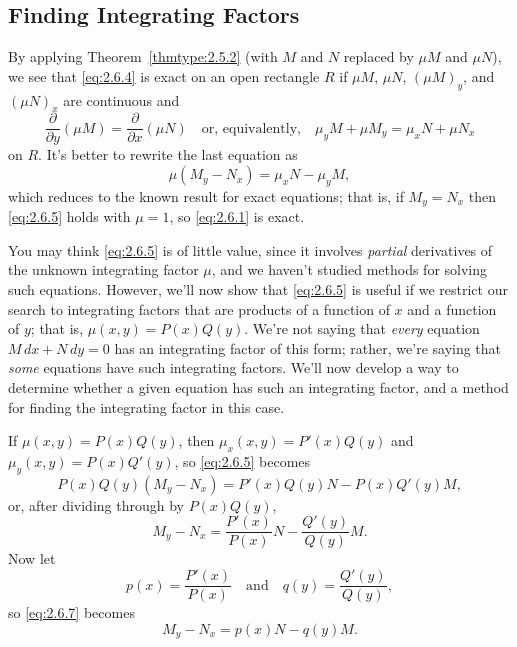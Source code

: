 \documentclass{ximera}
\begin{document}
\subsection*{Finding Integrating Factors}

By applying Theorem~\ref{thmtype:2.5.2} (with $M$ and $N$ replaced by $\mu M$
and $\mu N$), we see that \eqref{eq:2.6.4} is exact on an open rectangle
$R$ if $\mu M$, $\mu N$, $(\mu M)_y$, and $(\mu N)_x$ are continuous
and
$$
\frac{\partial}{\partial y}(\mu M)=\frac{\partial}{\partial x}
(\mu N) \quad\text{or, equivalently,}\quad
\mu_yM+\mu M_y=\mu_xN+\mu N_x
$$
on $R$. It's better to rewrite the last equation as
\begin{equation} \label{eq:2.6.5}
\mu(M_y-N_x)=\mu_xN-\mu_yM,
\end{equation}
which  reduces to  the known result for exact equations;
that is, if $M_y=N_x$ then \eqref{eq:2.6.5} holds with $\mu=1$, so
\eqref{eq:2.6.1} is exact.

You may think  \eqref{eq:2.6.5} is of little value, since it involves
\textit{partial} derivatives of the unknown integrating factor $\mu$,
and we haven't studied methods for solving such equations. However,
we'll now show that \eqref{eq:2.6.5} is useful if we restrict our search
to integrating factors that are products of a function of
$x$ and a function of $y$; that is,
$\mu(x,y)=P(x)Q(y)$.
We're not saying that \textit{every} equation
 $M\,dx+N\,dy=0$ has an integrating factor of this
form;   rather, we're saying that \textit{some} equations have
such integrating
factors.  We'll now develop a way to determine whether a given
equation has such an integrating factor, and a method for finding the
integrating factor in this case.


If $\mu(x,y)=P(x)Q(y)$, then $\mu_x(x,y)=P'(x)Q(y)$ and
$\mu_y(x,y)=P(x)Q'(y)$, so \eqref{eq:2.6.5} becomes
\begin{equation} \label{eq:2.6.6}
P(x)Q(y)(M_y-N_x)=P'(x)Q(y)N-P(x)Q'(y)M,
\end{equation}
or, after dividing through by $P(x)Q(y)$,
\begin{equation} \label{eq:2.6.7}
M_y-N_x=\frac{P'(x)}{P(x)}N-\frac{Q'(y)}{Q(y)}M.
\end{equation}
Now let
$$
p(x)=\frac{P'(x)}{P(x)}\quad \text{and}\quad q(y)=\frac{Q'(y)}{Q(y)},
$$
so \eqref{eq:2.6.7} becomes
\begin{equation} \label{eq:2.6.8}
M_y-N_x=p(x)N-q(y)M.
\end{equation}
\end{document}
